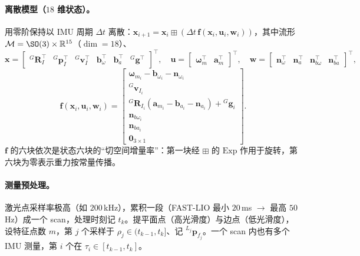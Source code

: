 \paragraph{离散模型（$18$ 维状态）。}
用零阶保持以 IMU 周期 $\Delta t$ 离散：$\mathbf{x}_{i+1}=\mathbf{x}_i\boxplus(\Delta t\,\mathbf{f}(\mathbf{x}_i,\mathbf{u}_i,\mathbf{w}_i))$，其中流形 $\mathcal{M}=\SO(3)\times\mathbb{R}^{15}$（$\dim=18$）、
\begin{equation}
\mathbf{x}=\begin{bmatrix}{}^G\mathbf{R}_I^\top & {}^G\mathbf{p}_I^\top & {}^G\mathbf{v}_I^\top & \mathbf{b}_\omega^\top & \mathbf{b}_a^\top & {}^G\mathbf{g}^\top\end{bmatrix}^\top,\quad
\mathbf{u}=\begin{bmatrix}\boldsymbol{\omega}_m^\top & \mathbf{a}_m^\top\end{bmatrix}^\top,\quad
\mathbf{w}=\begin{bmatrix}\mathbf{n}_\omega^\top & \mathbf{n}_a^\top & \mathbf{n}_{b\omega}^\top & \mathbf{n}_{ba}^\top\end{bmatrix}^\top,
\label{eq:lidar-fl-state}
\end{equation}
\begin{equation}
\mathbf{f}(\mathbf{x}_i,\mathbf{u}_i,\mathbf{w}_i)=\begin{bmatrix}
\boldsymbol{\omega}_{m_i}-\mathbf{b}_{\omega_i}-\mathbf{n}_{\omega_i}\\
{}^G\mathbf{v}_{I_i}\\
{}^G\mathbf{R}_{I_i}(\mathbf{a}_{m_i}-\mathbf{b}_{a_i}-\mathbf{n}_{a_i})+{}^G\mathbf{g}_i\\
\mathbf{n}_{b\omega_i}\\
\mathbf{n}_{ba_i}\\
\mathbf{0}_{3\times1}
\end{bmatrix}.
\label{eq:lidar-fl-f}
\end{equation}
$\mathbf{f}$ 的六块依次是状态六块的“切空间增量率”：第一块经 $\boxplus$ 的 $\mathrm{Exp}$ 作用于旋转，第六块为零表示重力按常量传播。

\paragraph{测量预处理。}
激光点采样率极高（如 $200$\,kHz），累积一段（FAST-LIO 最小 $20$\,ms $\to$ 最高 $50$\,Hz）成一个 scan，处理时刻记 $t_k$。提平面点（高光滑度）与边点（低光滑度），设特征点数 $m$，第 $j$ 个采样于 $\rho_j\in(t_{k-1},t_k]$、记 ${}^{L_j}\mathbf{p}_{f_j}$。一个 scan 内也有多个 IMU 测量，第 $i$ 个在 $\tau_i\in[t_{k-1},t_k]$。

